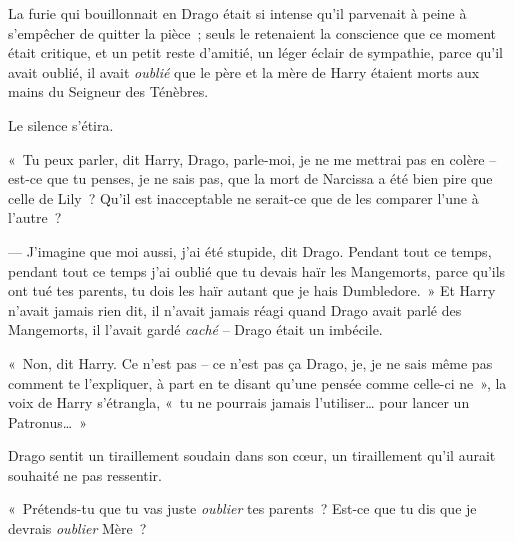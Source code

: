 \later

La furie qui bouillonnait en Drago était si intense qu'il parvenait à peine à s'empêcher de quitter la pièce~; seuls le retenaient la conscience que ce moment était critique, et un petit reste d'amitié, un léger éclair de sympathie, parce qu'il avait oublié, il avait \emph{oublié} que le père et la mère de Harry étaient morts aux mains du Seigneur des Ténèbres.

Le silence s'étira.

«~Tu peux parler, dit Harry, Drago, parle-moi, je ne me mettrai pas en colère -- est-ce que tu penses, je ne sais pas, que la mort de Narcissa a été bien pire que celle de Lily~?
Qu'il est inacceptable ne serait-ce que de les comparer l'une à l'autre~?

--- J'imagine que moi aussi, j'ai été stupide, dit Drago.
Pendant tout ce temps, pendant tout ce temps j'ai oublié que tu devais haïr les Mangemorts, parce qu'ils ont tué tes parents, tu dois les haïr autant que je hais Dumbledore.~»
Et Harry n'avait jamais rien dit, il n'avait jamais réagi quand Drago avait parlé des Mangemorts, il l'avait gardé \emph{caché} -- Drago était un imbécile.

«~Non, dit Harry.
Ce n'est pas -- ce n'est pas ça Drago, je, je ne sais même pas comment te l'expliquer, à part en te disant qu'une pensée comme celle-ci ne~», la voix de Harry s'étrangla, «~tu ne pourrais jamais l'utiliser… pour lancer un Patronus…~»

Drago sentit un tiraillement soudain dans son cœur, un tiraillement qu'il aurait souhaité ne pas ressentir.

«~Prétends-tu que tu vas juste \emph{oublier} tes parents~?
Est-ce que tu dis que je devrais \emph{oublier} Mère~?

